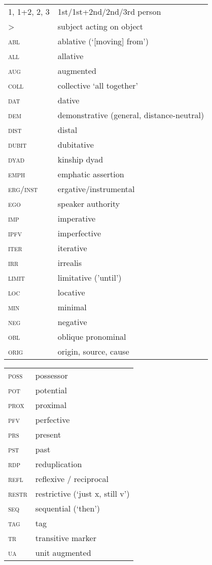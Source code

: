 \documentclass[output=paper,colorlinks,citecolor=brown]{langscibook}
\begin{document}
\begin{tabularx}{.45\textwidth}{lQ}
1, 1+2, 2, 3 & 1st/1st+2nd/2nd/3rd person \\
> & subject acting on object \\
\textsc{abl} & ablative (‘[moving] from’) \\
\textsc{all} & allative \\
\textsc{aug} & augmented \\
\textsc{coll} & collective ‘all together’  \\
\textsc{dat} & dative  \\
\textsc{dem} & demonstrative (general, distance-neutral) \\
\textsc{dist} & distal \\
\textsc{dubit} & dubitative \\
\textsc{dyad} & kinship dyad \\
\textsc{emph} & emphatic assertion \\
\textsc{erg/inst} & ergative/instrumental\\
\textsc{ego} & speaker authority \\
\textsc{imp} & imperative \\
\textsc{ipfv} & imperfective \\
\textsc{iter} & iterative \\
\textsc{irr} & irrealis  \\
\textsc{limit} & limitative ('until') \\
\textsc{loc} & locative  \\
\textsc{min} & minimal  \\
\textsc{neg} & negative  \\
\textsc{obl} & oblique pronominal    \\
\textsc{orig} & origin, source, cause  \\
\end{tabularx}
\begin{tabularx}{.45\textwidth}{lQ}
\textsc{poss} & possessor \\
\textsc{pot} & potential \\
\textsc{prox} & proximal   \\
\textsc{pfv} & perfective\\
\textsc{prs} & present   \\
\textsc{pst} & past  \\
\textsc{rdp}  & reduplication    \\
\textsc{refl} & reflexive / reciprocal \\
\textsc{restr} & restrictive (‘just x, still v’)\\
\textsc{seq} & sequential (‘then’)  \\
\textsc{tag} & tag \\
\textsc{tr} & transitive marker  \\
\textsc{ua} & unit augmented \\
\end{tabularx}
\end{document}
